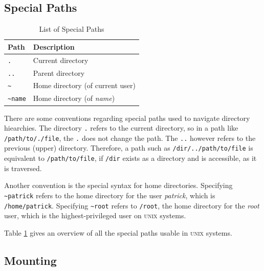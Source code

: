 \documentclass[a4paper]{article}
\begin{document}
\subsection{Special Paths}

\begin{table}
\centering\caption{List of Special Paths}\label{tbl:specialpaths}
\begin{tabular}{@{}ll@{}}
\toprule
Path & Description\\
\midrule
\texttt{.} & Current directory\\
\texttt{..} & Parent directory\\
\texttt{\textasciitilde} & Home directory (of current user)\\
\texttt{\textasciitilde name} & Home directory (of \emph{name})\\
\bottomrule
\end{tabular}  
\end{table}

There are some conventions regarding special paths used to navigate directory hiearchies. The directory \verb|.| refers to the current directory, so in a path like \verb|/path/to/./file|, the \verb|.| does not change the path. The \verb|..| however refers to the previous (upper) directory. Therefore, a path such as \verb|/dir/../path/to/file| is equivalent to \verb|/path/to/file|, if \verb|/dir| exists as a directory and is accessible, as it is traversed.

Another convention is the special syntax for home directories. Specifying \verb|~patrick| refers to the home directory for the user \emph{patrick}, which is \verb|/home/patrick|. Specifying \verb|~root| refers to \verb|/root|, the home directory for the \emph{root} user, which is the highest-privileged user on \textsc{unix} systems.

Table \ref{tbl:specialpaths} gives an overview of all the special paths usable in \textsc{unix} systems.



\subsection{Mounting}
\end{document}

